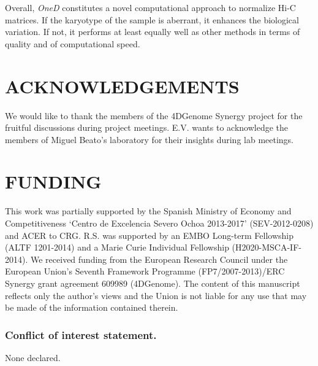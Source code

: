 \documentclass[a4,center,fleqn]{NAR}
\begin{document}
Overall, \textit{OneD} constitutes a novel computational approach to
normalize Hi-C matrices. If the karyotype of the sample is aberrant, it
enhances the biological variation.  If not, it performs at least equally
well as other methods in terms of quality and of computational speed.


\section{ACKNOWLEDGEMENTS}

We would like to thank the members of the 4DGenome Synergy project for the
fruitful discussions during project meetings. E.V. wants to acknowledge
the members of Miguel Beato's laboratory for their insights during lab
meetings.


\section{FUNDING}

This work was partially supported by the Spanish Ministry of Economy and
Competitiveness `Centro de Excelencia Severo Ochoa 2013-2017'
(SEV-2012-0208) and ACER to CRG. R.S. was supported by an EMBO Long-term
Fellowship (ALTF 1201-2014) and a Marie Curie Individual Fellowship
(H2020-MSCA-IF-2014). We received funding from the European Research
Council under the European Union's Seventh Framework Programme
(FP7/2007-2013)/ERC Synergy grant agreement 609989 (4DGenome). The content
of this manuscript reflects only the author's views and the Union is not
liable for any use that may be made of the information contained therein.

\subsubsection{Conflict of interest statement.} None declared.
\newpage



\end{document}
